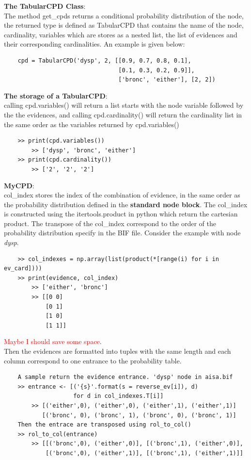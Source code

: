     \textbf{The TabularCPD Class}:\\
    The method get\_cpds returns a conditional probability distribution of the node, the returned type is defined as TabularCPD that contains the name of the node, cardinality, variables which are stores as a nested list, the list of evidences and their corresponding cardinalities. An example is given below:
    \begin{lstlisting}
    cpd = TabularCPD('dysp', 2, [[0.9, 0.7, 0.8, 0.1],
                                 [0.1, 0.3, 0.2, 0.9]],
                                 ['bronc', 'either'], [2, 2])
    \end{lstlisting}

    \textbf{The storage of a TabularCPD}:\\
    calling cpd.variables() will return a list starts with the node variable followed by the the evidences, and calling cpd.cardinality() will return the cardinality list in the same order as the variables returned by cpd.variables()
    \begin{lstlisting}
    >> print(cpd.variables())
        >> ['dysp', 'bronc', 'either']
    >> print(cpd.cardinality())
        >> ['2', '2', '2']
    \end{lstlisting}

    \textbf{MyCPD}:\\
    col\_index stores the index of the combination of evidence, in the same order as the probability distribution defined in the \textbf{standard node block}. The col\_index is constructed using the itertools.product in python which return the cartesian product. The transpose of the col\_index correspond to the order of the probability distribution specify in the BIF file. Consider the example with node \textit{dysp}.
    \begin{lstlisting}
    >> col_indexes = np.array(list(product(*[range(i) for i in ev_card])))
    >> print(evidence, col_index) 
        >> ['either', 'bronc']
        >> [[0 0]
            [0 1]
            [1 0]
            [1 1]]
    \end{lstlisting}
    \textcolor{red}{Maybe I should save some space}.\\
    Then the evidences are formatted into tuples with the same length and each column correspond to one entrance to the probability table.\\
    \begin{lstlisting}
    A sample return the evidence entrance. 'dysp' node in aisa.bif
    >> entrance <- [('{s}'.format(s = reverse_ev[i]), d) 
                    for d in col_indexes.T[i]]
        >> [('either',0), ('either',0), ('either',1), ('either',1)]
           [('bronc', 0), ('bronc', 1), ('bronc', 0), ('bronc', 1)]
    Then the entrace are transposed using rol_to_col()
    >> rol_to_col(entrance)
        >> [[('bronc',0), ('either',0)], [('bronc',1), ('either',0)], 
            [('bronc',0), ('either',1)], [('bronc',1), ('either',1)]]
    \end{lstlisting}
    
